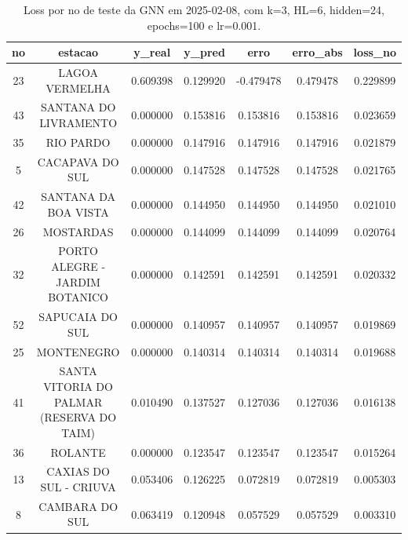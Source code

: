 \begin{table}[h]
\centering
\caption{Loss por no de teste da GNN em 2025-02-08, com k=3, HL=6, hidden=24, epochs=100 e lr=0.001.}
\label{tab:gnn_loss_k3_hl6_h24_e100_d20250208}
\begin{tabular}{ccccccc}
\toprule
no & estacao & y\_real & y\_pred & erro & erro\_abs & loss\_no \\
\midrule
23 & LAGOA VERMELHA & 0.609398 & 0.129920 & -0.479478 & 0.479478 & 0.229899 \\
43 & SANTANA DO LIVRAMENTO & 0.000000 & 0.153816 & 0.153816 & 0.153816 & 0.023659 \\
35 & RIO PARDO & 0.000000 & 0.147916 & 0.147916 & 0.147916 & 0.021879 \\
5 & CACAPAVA DO SUL & 0.000000 & 0.147528 & 0.147528 & 0.147528 & 0.021765 \\
42 & SANTANA DA BOA VISTA & 0.000000 & 0.144950 & 0.144950 & 0.144950 & 0.021010 \\
26 & MOSTARDAS & 0.000000 & 0.144099 & 0.144099 & 0.144099 & 0.020764 \\
32 & PORTO ALEGRE - JARDIM BOTANICO & 0.000000 & 0.142591 & 0.142591 & 0.142591 & 0.020332 \\
52 & SAPUCAIA DO SUL & 0.000000 & 0.140957 & 0.140957 & 0.140957 & 0.019869 \\
25 & MONTENEGRO & 0.000000 & 0.140314 & 0.140314 & 0.140314 & 0.019688 \\
41 & SANTA VITORIA DO PALMAR (RESERVA DO TAIM) & 0.010490 & 0.137527 & 0.127036 & 0.127036 & 0.016138 \\
36 & ROLANTE & 0.000000 & 0.123547 & 0.123547 & 0.123547 & 0.015264 \\
13 & CAXIAS DO SUL - CRIUVA & 0.053406 & 0.126225 & 0.072819 & 0.072819 & 0.005303 \\
8 & CAMBARA DO SUL & 0.063419 & 0.120948 & 0.057529 & 0.057529 & 0.003310 \\
\bottomrule
\end{tabular}
\end{table}
